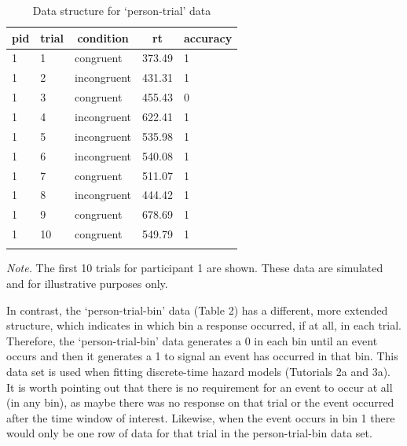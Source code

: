 \documentclass[
  man, donotrepeattitle,floatsintext]{apa6}
\begin{document}
\begin{table}[H]

\begin{center}
\begin{threeparttable}

\caption{\label{tab:ca-data-table}Data structure for `person-trial' data}

\begin{tabular}{lllll}
\toprule
pid & \multicolumn{1}{c}{trial} & \multicolumn{1}{c}{condition} & \multicolumn{1}{c}{rt} & \multicolumn{1}{c}{accuracy}\\
\midrule
1 & 1 & congruent & 373.49 & 1\\
1 & 2 & incongruent & 431.31 & 1\\
1 & 3 & congruent & 455.43 & 0\\
1 & 4 & incongruent & 622.41 & 1\\
1 & 5 & incongruent & 535.98 & 1\\
1 & 6 & incongruent & 540.08 & 1\\
1 & 7 & congruent & 511.07 & 1\\
1 & 8 & incongruent & 444.42 & 1\\
1 & 9 & congruent & 678.69 & 1\\
1 & 10 & congruent & 549.79 & 1\\
\bottomrule
\addlinespace
\end{tabular}

\begin{tablenotes}[para]
\normalsize{\textit{Note.} The first 10 trials for participant 1 are shown. These data are simulated and for illustrative purposes only.}
\end{tablenotes}

\end{threeparttable}
\end{center}

\end{table}

In contrast, the `person-trial-bin' data (Table 2) has a different, more extended structure, which indicates in which bin a response occurred, if at all, in each trial. Therefore, the `person-trial-bin' data generates a 0 in each bin until an event occurs and then it generates a 1 to signal an event has occurred in that bin. This data set is used when fitting discrete-time hazard models (Tutorials 2a and 3a). It is worth pointing out that there is no requirement for an event to occur at all (in any bin), as maybe there was no response on that trial or the event occurred after the time window of interest. Likewise, when the event occurs in bin 1 there would only be one row of data for that trial in the person-trial-bin data set.
\end{document}
